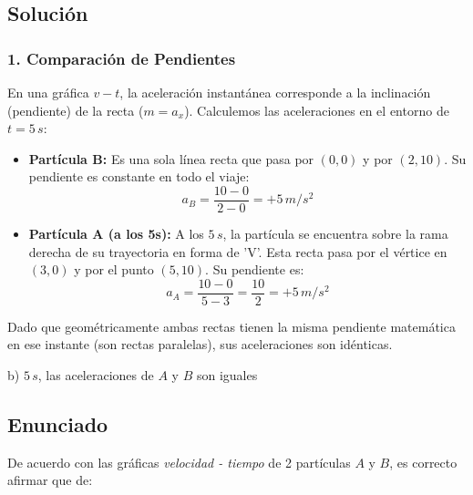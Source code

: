\documentclass[12pt, a4paper]{article}
\begin{document}
\subsection*{Solución}

\subsubsection*{1. Comparación de Pendientes}
En una gráfica $v-t$, la aceleración instantánea corresponde a la inclinación (pendiente) de la recta ($m = a_x$). 
Calculemos las aceleraciones en el entorno de $t = 5\,\si{s}$:
\begin{itemize}
    \item \textbf{Partícula B:} Es una sola línea recta que pasa por $(0,0)$ y por $(2,10)$. Su pendiente es constante en todo el viaje: 
    $$ a_B = \frac{10 - 0}{2 - 0} = +5\,\si{m/s^2} $$
    \item \textbf{Partícula A (a los 5s):} A los $5\,\si{s}$, la partícula se encuentra sobre la rama derecha de su trayectoria en forma de 'V'. Esta recta pasa por el vértice en $(3,0)$ y por el punto $(5,10)$. Su pendiente es:
    $$ a_A = \frac{10 - 0}{5 - 3} = \frac{10}{2} = +5\,\si{m/s^2} $$
\end{itemize}
Dado que geométricamente ambas rectas tienen la misma pendiente matemática en ese instante (son rectas paralelas), sus aceleraciones son idénticas.

\begin{tcolorbox}[colback=green!5!white, colframe=green!50!black, title=Respuesta Final]
\centering \Large b) $5\,\si{s}$, las aceleraciones de $A$ y $B$ son iguales
\end{tcolorbox}

\newpage

\subsection*{Enunciado}
De acuerdo con las gráficas \textit{velocidad - tiempo} de 2 partículas $A$ y $B$, es correcto afirmar que de:

\begin{center}
\end{center}
\end{document}
